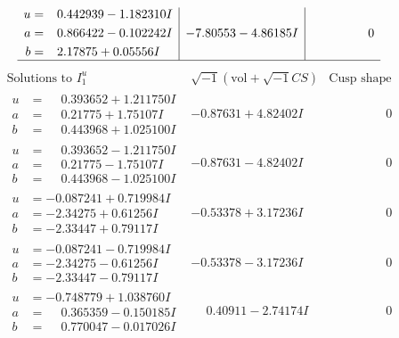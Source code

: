 \documentclass[1p]{elsarticle_modified}
\theoremstyle{definition}
\newcommand{\I}{\sqrt{-1}}
\begin{document}
$$\begin{array}{c|c|c}
\begin{aligned}
u &= \phantom{-}0.442939 - 1.182310 I \\
a &= \phantom{-}0.866422 - 0.102242 I \\
b &= \phantom{-}2.17875 + 0.05556 I\end{aligned}
 & -7.80553 - 4.86185 I & \phantom{-0.000000 } 0\\
 \hline 
 \end{array}$$\newpage$$\begin{array}{c|c|c}  
\text{Solutions to }I^u_{1}& \I (\text{vol} + \sqrt{-1}CS) & \text{Cusp shape}\\
 \hline 
\begin{aligned}
u &= \phantom{-}0.393652 + 1.211750 I \\
a &= \phantom{-}0.21775 + 1.75107 I \\
b &= \phantom{-}0.443968 + 1.025100 I\end{aligned}
 & -0.87631 + 4.82402 I & \phantom{-0.000000 } 0 \\ \hline\begin{aligned}
u &= \phantom{-}0.393652 - 1.211750 I \\
a &= \phantom{-}0.21775 - 1.75107 I \\
b &= \phantom{-}0.443968 - 1.025100 I\end{aligned}
 & -0.87631 - 4.82402 I & \phantom{-0.000000 } 0 \\ \hline\begin{aligned}
u &= -0.087241 + 0.719984 I \\
a &= -2.34275 + 0.61256 I \\
b &= -2.33447 + 0.79117 I\end{aligned}
 & -0.53378 + 3.17236 I & \phantom{-0.000000 } 0 \\ \hline\begin{aligned}
u &= -0.087241 - 0.719984 I \\
a &= -2.34275 - 0.61256 I \\
b &= -2.33447 - 0.79117 I\end{aligned}
 & -0.53378 - 3.17236 I & \phantom{-0.000000 } 0 \\ \hline\begin{aligned}
u &= -0.748779 + 1.038760 I \\
a &= \phantom{-}0.365359 - 0.150185 I \\
b &= \phantom{-}0.770047 - 0.017026 I\end{aligned}
 & \phantom{-}0.40911 - 2.74174 I & \phantom{-0.000000 } 0 \\ \hline\begin{aligned}

\end{aligned}
\end{array}$$
\end{document}
